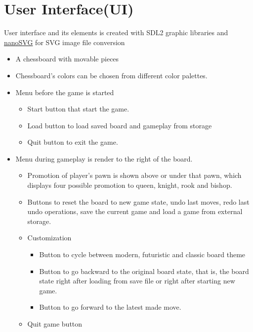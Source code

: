 \documentclass[a4paper, 10pt, titlepage]{report}
\begin{document}
\section{User Interface(UI)}
User interface and its elements is created with SDL2 graphic libraries and \href{https://github.com/memononen/nanosvg}{nanoSVG} for SVG image file conversion
\begin{itemize}
    \item A chessboard with movable pieces
    \item Chessboard's colors can be chosen from different color palettes.

    \item Menu before the game is started
          \begin{itemize}
              \item Start button that start the game.
              \item Load button to load saved board and gameplay from storage
              \item Quit button to exit the game.
          \end{itemize}
    \item Menu during gameplay is render to the right of the board.
          \begin{itemize}
              \item Promotion of player's pawn is shown above or under that pawn, which displays four possible promotion to queen, knight, rook and bishop.
              \item Buttons to reset the board to new game state, undo last moves, redo last undo operations, save the current game and load a game from external storage.
              \item Customization
                    \begin{itemize}
                        \item Button to cycle between modern, futuristic and classic board theme
                        \item Button to go backward to the original board state, that is, the board state right after loading from save file or right after starting new game.
                        \item Button to go forward to the latest made move.
                    \end{itemize}
              \item Quit game button
          \end{itemize}
\end{itemize}
\end{document}
